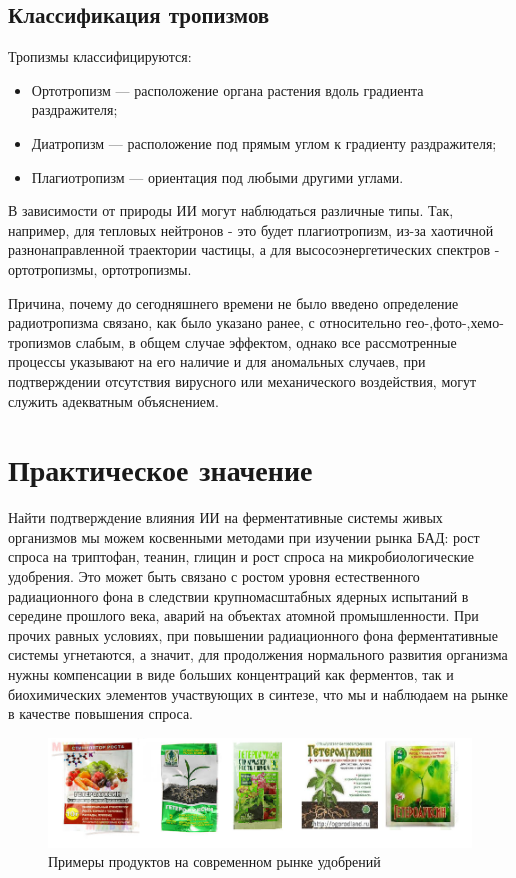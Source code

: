 \documentclass[11pt]{article}
\begin{document}
\subsection{Классификация тропизмов}
Тропизмы классифицируются:

\begin{itemize} 
\item Ортотропизм — расположение органа растения вдоль градиента раздражителя; 
\item Диатропизм — расположение под прямым углом к градиенту раздражителя; 
\item Плагиотропизм — ориентация под любыми другими углами.
\end{itemize} 

В зависимости от природы ИИ могут наблюдаться различные типы. Так, например, для тепловых нейтронов - это будет плагиотропизм, из-за хаотичной разнонаправленной траектории частицы, а для высосоэнергетических спектров - ортотропизмы, ортотропизмы.

Причина, почему до сегодняшнего времени не было введено определение радиотропизма связано, как было указано ранее, с относительно гео-,фото-,хемо-тропизмов  слабым, в общем случае эффектом, однако все рассмотренные процессы указывают на его наличие и для аномальных случаев, при подтверждении отсутствия вирусного или механического воздействия, могут служить адекватным объяснением.

\section{Практическое значение}
Найти подтверждение влияния ИИ на ферментативные системы живых организмов мы можем косвенными методами при изучении рынка БАД: рост спроса на триптофан, теанин, глицин и рост спроса на микробиологические удобрения. Это может быть связано с ростом уровня естественного радиационного фона в следствии крупномасштабных ядерных испытаний в середине прошлого века, аварий на объектах атомной промышленности. При прочих равных условиях, при повышении радиационного фона ферментативные системы угнетаются, а значит, для продолжения нормального развития организма нужны компенсации в виде больших концентраций как ферментов, так и биохимических элементов участвующих в синтезе, что мы и наблюдаем на рынке в качестве повышения спроса.

\begin{figure}[!htpb]
\centering
\includegraphics[scale=0.5]{geteroauxin}
\caption{Примеры продуктов на современном рынке удобрений}
\label{}
\end{figure}
\end{document}
